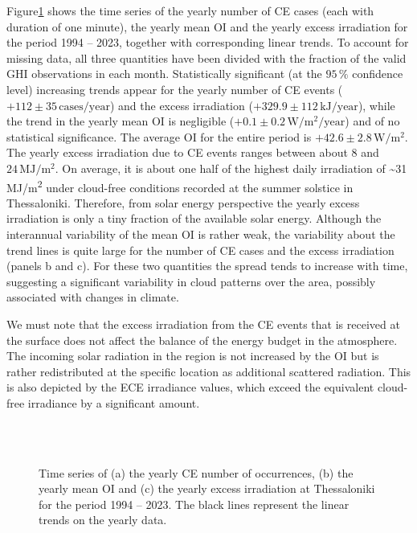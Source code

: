 \documentclass[preprint, 5p,
authoryear]{elsarticle} %
\begin{document}
Figure\nobreakspace{}\ref{fig:P-energy} shows the time series of the
yearly number of CE cases (each with duration of one minute), the yearly
mean OI and the yearly excess irradiation for the period 1994 -- 2023,
together with corresponding linear trends. To account for missing data,
all three quantities have been divided with the fraction of the valid
GHI observations in each month. Statistically significant (at the
\(95\,\%\) confidence level) increasing trends appear for the yearly
number of CE events (\(+112\pm 35\,\text{cases}/\text{year}\)) and the
excess irradiation (\(+329.9 \pm 112\,\text{kJ}/\text{year}\)), while
the trend in the yearly mean OI is negligible
(\(+0.1\pm 0.2\,\text{W}/\text{m}^2/\text{year}\)) and of no statistical
significance. The average OI for the entire period is
\(+42.6\pm 2.8\,\text{W}/\text{m}^2\). The yearly excess irradiation due
to CE events ranges between about \(8\) and
\(24\,\text{MJ}/\text{m}^2\). On average, it is about one half of the
highest daily irradiation of \textasciitilde31 MJ/m\textsuperscript{2}
under cloud-free conditions recorded at the summer solstice in
Thessaloniki. Therefore, from solar energy perspective the yearly excess
irradiation is only a tiny fraction of the available solar energy.
Although the interannual variability of the mean OI is rather weak, the
variability about the trend lines is quite large for the number of CE
cases and the excess irradiation (panels b and c). For these two
quantities the spread tends to increase with time, suggesting a
significant variability in cloud patterns over the area, possibly
associated with changes in climate.

We must note that the excess irradiation from the CE events that is
received at the surface does not affect the balance of the energy budget
in the atmosphere. The incoming solar radiation in the region is not
increased by the OI but is rather redistributed at the specific location
as additional scattered radiation. This is also depicted by the ECE
irradiance values, which exceed the equivalent cloud-free irradiance by
a significant amount.

\begin{figure}%
        {\centering
            \\
            \\
        }
    \caption{Time series of (a) the yearly CE number of occurrences, (b) the yearly mean OI and (c) the yearly excess irradiation at Thessaloniki for the period 1994 – 2023. The black lines represent the linear trends on the yearly data.}\label{fig:P-energy}
\end{figure}
\end{document}

